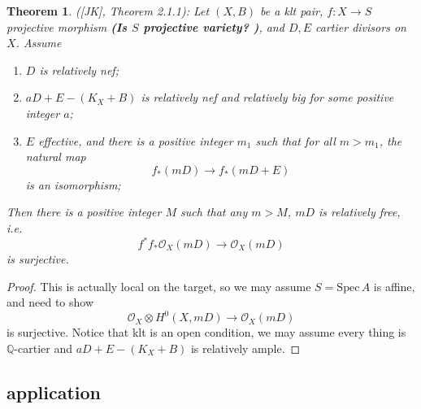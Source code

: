 \documentclass{article}
\newtheorem{thm}[defn]{Theorem}
\begin{document}
\begin{thm}
  ([JK], Theorem 2.1.1): Let $ (X,B) $ be a klt pair, $ f:X\to S $ projective morphism \textbf{(Is $ S $ projective variety? )}, and $ D,E $ cartier divisors on $ X $. Assume
  \begin{enumerate}
    \item $ D $ is relatively nef;
    \item $ aD+E-(K_X+B) $ is relatively nef and relatively big for some positive integer $ a $;
    \item $ E $ effective, and there is a positive integer $ m_1 $ such that for all $ m>m_1 $, the natural map 
    \[ f_*(mD)\to f_*(mD+E) \]
    is an isomorphism;
  \end{enumerate}
  Then there is a positive integer $ M $ such that any $ m>M $, $ mD $ is relatively free, i.e.
  \[ f^*f_*\mathcal{O}_X(mD)\to \mathcal{O}_X(mD) \]
  is surjective.
\end{thm}
\begin{proof}
  This is actually local on the target, so we may assume $ S=\mathrm{Spec}\,A $ is affine, and need to show 
  \[ \mathcal{O}_X \otimes H^0(X,mD)\to \mathcal{O}_X(mD)\]
  is surjective. Notice that klt is an open condition, we may assume every thing is $ \mathbb{Q} $-cartier and $ aD+E-(K_X+B) $ is relatively ample. 
\end{proof}
\subsection{application}
\end{document}
